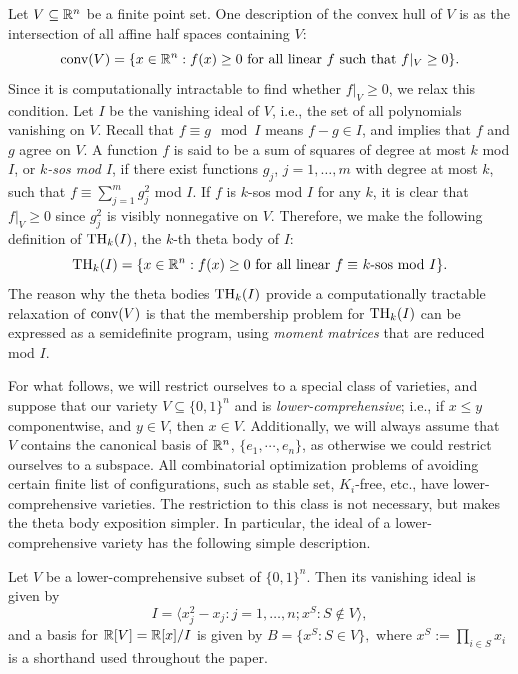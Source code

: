 Let $V \subseteq \mathbb{R}^n$ be a finite point set. One description of the convex hull of $V$ is as the intersection of all affine half spaces containing $V$:
$$\hbox{conv}(V) = \{x \in \mathbb{R}^n: f(x) \ge 0 \hbox{ for all linear $f$ such that } f|_V \ge 0\}.$$
Since it is computationally intractable to find whether $f|_V \ge 0$, we relax this condition. Let $I$ be the vanishing ideal of $V$, i.e., the set of all polynomials vanishing on $V$. Recall that $f \equiv g \mod I$ means $f - g \in I$, and implies that $f$ and $g$ agree on $V$. A function $f$ is said to be a sum of squares of degree at most $k$ mod $I$, or {\em $k$-sos mod $I$}, if there exist functions $g_j$, $j=1,\ldots,m$ with degree at most $k$, such that $f \equiv \sum_{j=1}^mg_j^2$ mod $I$. If $f$ is $k$-sos mod $I$ for any $k$, it is clear that $f|_V \ge 0$ since $g_j^2$ is visibly nonnegative on $V$. Therefore, we make the following definition of $\textup{TH}_k(I)$, the $k$-th theta body of $I$:
$$\textup{TH}_k(I) = \{x \in \mathbb{R}^n: f(x) \ge 0 \hbox{ for all linear $f \equiv$ $k$-sos mod $I$}\}.$$
The reason why the theta bodies $\textup{TH}_k(I)$ provide a computationally tractable relaxation of $\hbox{conv}(V)$ is that the membership problem for $\textup{TH}_k(I)$ can be expressed as a semidefinite program, using {\em moment matrices} that are reduced mod $I$. 

For what follows, we will restrict ourselves to a special class of varieties, and suppose that our variety $V \subseteq \{0,1\}^n$ and is {\em lower-comprehensive}; i.e., if $x\le y$ componentwise, and $y \in V$, then $x \in V$. Additionally, we will always assume that $V$ contains the canonical
basis of $\mathbb{R}^n$, $\{e_1, \cdots, e_n\}$, as otherwise we could restrict ourselves to a subspace. All combinatorial optimization problems of avoiding certain finite list of configurations, such as stable set, $K_i$-free, etc., have lower-comprehensive varieties. The restriction to this class is not necessary, but makes the theta body exposition simpler. In particular, the ideal of a lower-comprehensive variety has the following simple description.

\begin{lemma} \label{ideal}
Let $V$ be a lower-comprehensive subset of $\{0,1\}^n$. Then its vanishing ideal is given by
$$I=\langle x_j^2 - x_j: j = 1, \ldots, n;
x^S: S \notin V\rangle,$$ and a basis for $\mathbb{R}[V] = \mathbb{R}[x]/I$ is given by $B = \{x^S: S \in V\},$
where $x^S := \prod_{i \in S} x_i$ is a shorthand used throughout the paper.
\end{lemma}

